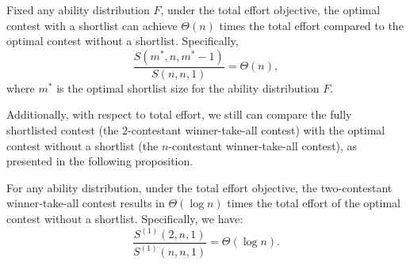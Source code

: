 \begin{theorem}\label{thm:TotalOPTVAN}
    Fixed any ability distribution $F$, under the total effort objective, the optimal contest with a shortlist can achieve $\Theta(n)$ times the total effort compared to the optimal contest without a shortlist. Specifically,
    $$\frac{S(m^*,n,m^*-1)}{S(n,n,1)} = \Theta(n),$$
    where $m^*$ is the optimal shortlist size for the ability distribution $F$. 
\end{theorem}

Additionally, with respect to total effort, we still can compare the fully shortlisted contest (the 2-contestant winner-take-all contest) with the optimal contest without a shortlist (the $n$-contestant winner-take-all contest), as presented in the following proposition.
\begin{proposition}\label{prop:TotalTWOVAN}
    For any ability distribution, under the total effort objective, the two-contestant winner-take-all contest results in $\Theta(\log n)$ times the total effort of the optimal contest without a shortlist. Specifically, we have:
    $$\frac{S^{(1)}(2,n,1)}{S^{(1)}(n,n,1)} = \Theta(\log n).$$
\end{proposition}







